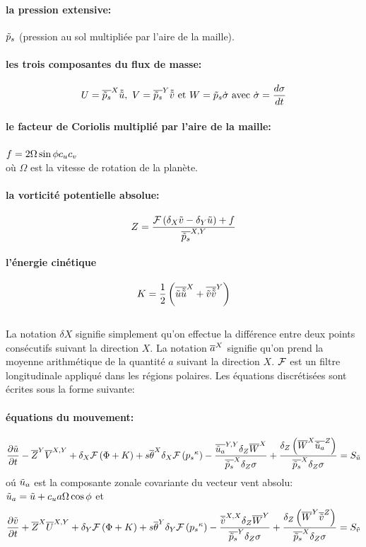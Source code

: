 \paragraph{la pression extensive:}
$\tilde{p}_s$ (pression au sol multipli\'ee
par l'aire de la maille).
%
\paragraph{les trois composantes du flux de masse:}
\begin{equation}
U={\overline{\tilde{p}_s}}^{ X } \tilde{\tilde{u}} ,\  V= {\overline{\tilde{p}_s}}^{ Y } \tilde{\tilde{v}} \  \mbox{et} \
W= \tilde{p}_s \dot{\sigma}
\ \mbox{avec}\ \dot{\sigma}=\frac{d\sigma}{dt}
\end{equation}
%
\paragraph{le facteur de Coriolis multipli\'e par l'aire de la maille:}
$f=2\Omega \sin{\phi} c_u c_v$\\
o\`u $\Omega$ est la vitesse de rotation de la plan\`ete.
%
\paragraph{la vorticit\'e potentielle absolue:}
\begin{equation}
Z=\frac{{\cal F}\left( \delta_X \tilde{v} - \delta_Y \tilde{u} \right) + f}{{\overline{\tilde{p}_s}}^{ X,Y }}
\end{equation}
%
\paragraph{l'\'energie cin\'etique}
\begin{equation}
K=\frac{1}{2} \left( {\overline{\tilde{u} \tilde{\tilde{u}}}}^{ X } + {\overline{\tilde{v} \tilde{\tilde{v}}}}^{ Y } \right)
\end{equation}\\
%
La notation $\delta X$ signifie simplement qu'on
effectue la diff\'erence entre deux points cons\'ecutifs
suivant la direction $X$.
La notation ${\overline{a}}^{ X }$ signifie qu'on prend la moyenne arithm\'etique
de la quantit\'e $a$ suivant la direction $X$. ${\cal F}$ est un filtre longitudinale appliqu\'e dans les r\'egions polaires.
Les \'equations discr\'etis\'ees sont \'ecrites sous la forme
suivante:
\paragraph{\'equations du mouvement:}
\begin{equation} \label{eq:u1}
\frac{\partial \tilde{u}}{\partial t} -
{\overline{Z}}^{ Y } {\overline{V}}^{ X,Y }
+ \delta_X {\cal F}\left( \Phi + K \right)
+s {\overline{\theta}}^{ X } \delta_X {\cal F}\left( {p_s}^\kappa \right)
- \frac{{\overline{\tilde{u}_{a}}}^{ Y,Y } \delta_Z {\overline{W}}^{ X } }
{{\overline{\tilde{p}_s}}^{ X } \delta_Z \sigma }
+ \frac{\delta_Z \left( {\overline{W}}^{ X } {\overline{\tilde{u}_{a}}}^{ Z } \right) }
{{\overline{\tilde{p}_s}}^{ X } \delta_Z \sigma}
=S_{\tilde{u}}
\end{equation}
o\'u $\tilde{u}_{a}$ est la composante zonale covariante
du vecteur vent absolu:
$\tilde{u}_{a}=\tilde{u}+c_u a \Omega \cos{\phi}$ et
\begin{equation} \label{eq:v1}
\frac{\partial \tilde{v}}{\partial t} + {\overline{Z}}^{ X } {\overline{U}}^{ X,Y } + \delta_Y {\cal F}\left( \Phi + K \right)
+s {\overline{\theta}}^{ Y } \delta_Y {\cal F}\left( {p_s}^\kappa \right)
- \frac{{\overline{\tilde{v}}}^{ X,X } \delta_Z {\overline{W}}^{ Y } }
{{\overline{\tilde{p}_s}}^{ Y } \delta_Z \sigma}
+ \frac{\delta_Z \left( {\overline{W}}^{ Y } {\overline{\tilde{v}}}^{ Z } \right) }
{{\overline{\tilde{p}_s}}^{ X } \delta_Z \sigma}
=S_{\tilde{v}}
\end{equation}
%
